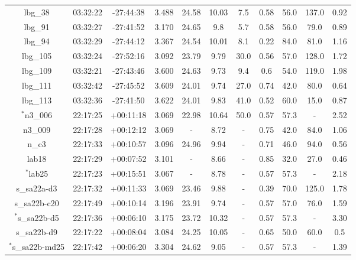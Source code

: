 \documentclass[fleqn,usenatbib]{mn2e}
\begin{document}
\begin{table*}
\begin{threeparttable}
\begin{tabular}{ccccccccccc}
lbg\_38         & 03:32:22 & -27:44:38 & 3.488       & 24.58  & 10.03 & 7.5  & 0.58        & 56.0        & 137.0   & 0.92      \\
lbg\_91         & 03:32:27 & -27:41:52 & 3.170       & 24.65  & 9.8   & 5.7  & 0.58        & 56.0        & 79.0    & 0.89 \\
lbg\_94         & 03:32:29 & -27:44:12 & 3.367       & 24.54  & 10.01 & 8.1  & 0.22        & 84.0        & 81.0    & 1.16      \\
lbg\_105        & 03:32:24 & -27:52:16 & 3.092      & 23.79  & 9.79  & 30.0 & 0.56        & 57.0        & 128.0   & 1.72      \\
lbg\_109        & 03:32:21 & -27:43:46 & 3.600       & 24.63  & 9.73  & 9.4  & 0.6         & 54.0        & 119.0   & 1.98      \\
lbg\_111        & 03:32:42 & -27:45:52 & 3.609       & 24.01  & 9.74  & 27.0 & 0.74        & 42.0        & 80.0    & 0.64      \\
lbg\_113        & 03:32:36 & -27:41:50 & 3.622      & 24.01  & 9.83  & 41.0 & 0.52        & 60.0        & 15.0    & 0.87      \\
$^{*}$n3\_006       & 22:17:25 & +00:11:18 & 3.069     & 22.98 & 10.64 & 50.0 & 0.57         & 57.3        & -    & 2.52      \\
n3\_009       & 22:17:28 & +00:12:12 & 3.069 & -    & 8.72  & -            & 0.75        & 42.0        & 84.0    & 1.06      \\
n\_c3         & 22:17:33 & +00:10:57 & 3.096       & 24.96 & 9.94  & -            & 0.71        & 46.0        & 94.0    & 0.56      \\
lab18         & 22:17:29 & +00:07:52 & 3.101           & -    & 8.66  & -            & 0.85        & 32.0        & 27.0    & 0.46      \\
$^{*}$lab25         & 22:17:23 & +00:15:51 & 3.067      & -    & 8.78  & -            & 0.57         & 57.3        & -    & 2.18      \\
s\_sa22a-d3   & 22:17:32 & +00:11:33 & 3.069 & 23.46 & 9.88  & -            & 0.39        & 70.0        & 125.0   & 1.78      \\
s\_sa22b-c20  & 22:17:49 & +00:10:14 & 3.196     & 23.91 & 9.74  & -            & 0.57        & 57.0        & 76.0    & 1.59      \\
$^{*}$s\_sa22b-d5  & 22:17:36 & +00:06:10 & 3.175 & 23.72 & 10.32 & -            & 0.57         & 57.3        & -    & 3.30      \\
s\_sa22b-d9   & 22:17:22 & +00:08:04 & 3.084    & 24.25 & 10.05 & -            & 0.65        & 50.0        & 60.0    & 0.5       \\
$^{*}$s\_sa22b-md25 & 22:17:42 & +00:06:20 & 3.304     & 24.62 & 9.05  & -            & 0.57         & 57.3        & -    & 1.39      


\end{tabular}
\end{threeparttable}
\end{table*}
\end{document}
